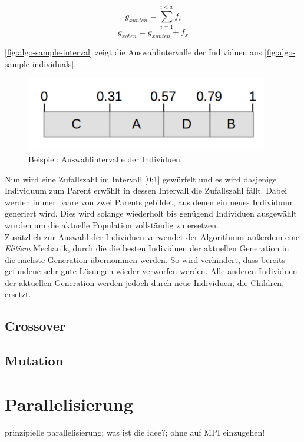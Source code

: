 \documentclass[12pt,a4paper]{scrreprt}
\newcommand{\absatz}{\\[12pt]}
\begin{document}
$$
g_{x unten} = \sum_{i=1}^{i<x} f_i
$$
$$
g_{x oben} = g_{x unten} + f_x
$$

\autoref{fig:algo-sample-interval} zeigt die Auswahlintervalle der Individuen aus \autoref{fig:algo-sample-individuals}.

\begin{figure}[ht]
  	\centering
	\includegraphics[width=300pt]{images/algo_03_interval.png}
	\caption{Beispiel: Auswahlintervalle der Individuen}
	\label{fig:algo-sample-interval}
\end{figure}

Nun wird eine Zufallszahl im Intervall [0;1] gewürfelt und es wird dasjenige Individuum zum Parent erwählt in dessen Intervall die Zufallszahl fällt. Dabei werden immer paare von zwei Parents gebildet, aus denen ein neues Individuum generiert wird. Dies wird solange wiederholt bis genügend Individuen ausgewählt wurden um die aktuelle Population vollständig zu ersetzen.\absatz
Zusätzlich zur Auswahl der Individuen verwendet der Algorithmus außerdem eine \textit{Elitism} Mechanik, durch die die besten Individuen der aktuellen Generation in die nächste Generation übernommen werden. So wird verhindert, dass bereits gefundene sehr gute Lösungen wieder verworfen werden. Alle anderen Individuen der aktuellen Generation werden jedoch durch neue Individuen, die Children, ersetzt.

\subsection{Crossover}
\label{subsec:crossover}

\subsection{Mutation}
\label{subsec:mutation}

\section{Parallelisierung}
\label{sec:parallelisierung}

prinzipielle parallelisierung; was ist die idee?; ohne auf MPI einzugehen!
\end{document}
